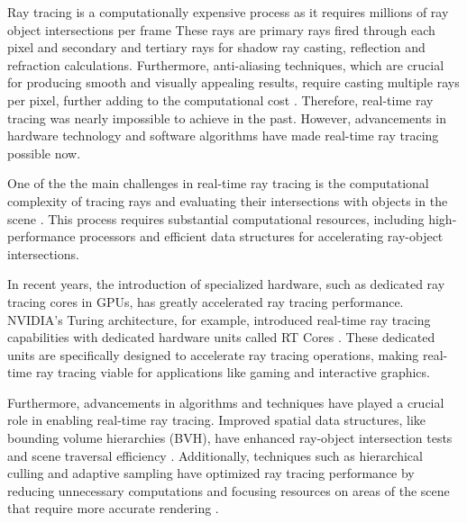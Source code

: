 \documentclass[conference]{IEEEtran}
\begin{document}
Ray tracing is a computationally expensive process as it requires millions of ray object intersections per frame These rays are primary rays fired through each pixel and secondary and tertiary rays for shadow ray casting, reflection and refraction calculations. Furthermore, anti-aliasing techniques, which are crucial for producing smooth and visually appealing results, require casting multiple rays per pixel, further adding to the computational cost \cite{Ray_Tracing_Gems}. Therefore, real-time ray tracing was nearly impossible to achieve in the past. However, advancements in hardware technology and software algorithms have made real-time ray tracing possible now.

One of the the main challenges in real-time ray tracing is the computational complexity of tracing rays and evaluating their intersections with objects in the scene \cite{Realtime_Ray_Tracing_and_its_use_for_Interactive_Global_Illumination}. This process requires substantial computational resources, including high-performance processors and efficient data structures for accelerating ray-object intersections.

In recent years, the introduction of specialized hardware, such as dedicated ray tracing cores in GPUs, has greatly accelerated ray tracing performance. NVIDIA's Turing architecture, for example, introduced real-time ray tracing capabilities with dedicated hardware units called RT Cores \cite{NVIDIA_Turing_GPU_Architecture,Examination_RTX}. These dedicated units are specifically designed to accelerate ray tracing operations, making real-time ray tracing viable for applications like gaming and interactive graphics.

Furthermore, advancements in algorithms and techniques have played a crucial role in enabling real-time ray tracing. Improved spatial data structures, like bounding volume hierarchies (BVH), have enhanced ray-object intersection tests and scene traversal efficiency \cite{BVH_for_ray_tracing}. Additionally, techniques such as hierarchical culling and adaptive sampling have optimized ray tracing performance by reducing unnecessary computations and focusing resources on areas of the scene that require more accurate rendering \cite{Mattausch2015CHCRTCH}.
\end{document}
